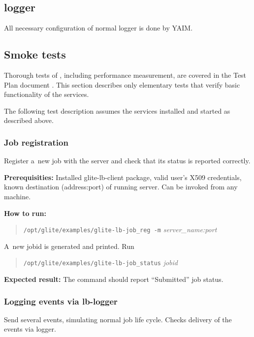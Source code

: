 \subsection{\LB logger}

All necessary configuration of normal \LB logger is done by YAIM.

\subsection{Smoke tests}

Thorough tests of \LB, including performance measurement, are
covered in the \LB Test Plan document \cite{lbtp}.
This section describes only elementary tests that verify basic
functionality of the services.

The following test description assumes the \LB services installed
and started as described above.

\def\req{\noindent\textbf{Prerequisities:}\xspace}
\def\how{\noindent\textbf{How to run:}\xspace}
\def\result{\noindent\textbf{Expected result:}\xspace}

\subsubsection{Job registration}

Register a~new job with the \LB server and check that its status is
reported correctly.

\req Installed glite-lb-client package, valid user's X509 credentials,
known destination (address:port) of running \LB server.
Can be invoked from any machine.

\how 
\begin{quote}
\verb'/opt/glite/examples/glite-lb-job_reg -m' \emph{server\_name:port}
\end{quote}
A~new jobid is generated and printed.  Run 
\begin{quote}
\verb'/opt/glite/examples/glite-lb-job_status' \emph{jobid}
\end{quote}

\result
The command should report ``Submitted'' job status.

\subsubsection{Logging events via lb-logger}

\label{smoke-log}

Send several \LB events, simulating normal job life cycle.
Checks delivery of the events via \LB logger.

